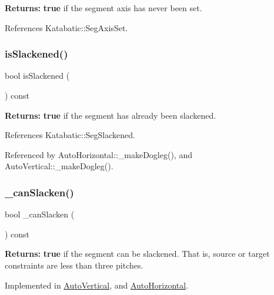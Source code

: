 {\bfseries Returns\+:} {\bfseries true} if the segment axis has never been set. 

References Katabatic\+::\+Seg\+Axis\+Set.

\mbox{\label{classKatabatic_1_1AutoSegment_a782cff57d3fe10e758d19ee65a06643d}} 
\subsubsection{\texorpdfstring{is\+Slackened()}{isSlackened()}}
{\footnotesize\ttfamily bool is\+Slackened (\begin{DoxyParamCaption}{ }\end{DoxyParamCaption}) const\hspace{0.3cm}{\ttfamily [inline]}}

{\bfseries Returns\+:} {\bfseries true} if the segment has already been slackened. 

References Katabatic\+::\+Seg\+Slackened.



Referenced by Auto\+Horizontal\+::\+\_\+make\+Dogleg(), and Auto\+Vertical\+::\+\_\+make\+Dogleg().

\mbox{\label{classKatabatic_1_1AutoSegment_a676fcb7ece71d129b7a4d87a3f2e07aa}} 
\subsubsection{\texorpdfstring{\+\_\+can\+Slacken()}{\_canSlacken()}}
{\footnotesize\ttfamily bool \+\_\+can\+Slacken (\begin{DoxyParamCaption}{ }\end{DoxyParamCaption}) const\hspace{0.3cm}{\ttfamily [pure virtual]}}

{\bfseries Returns\+:} {\bfseries true} if the segment can be slackened. That is, source or target constraints are less than three pitches. 

Implemented in \mbox{\hyperlink{classKatabatic_1_1AutoVertical_a2ced98fb06f208aa88c0962a706e64db}{Auto\+Vertical}}, and \mbox{\hyperlink{classKatabatic_1_1AutoHorizontal_a2ced98fb06f208aa88c0962a706e64db}{Auto\+Horizontal}}.



